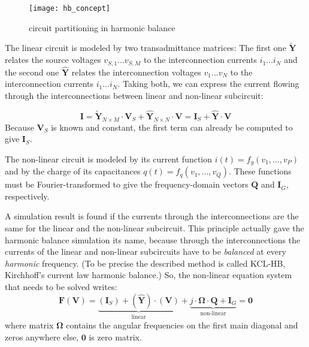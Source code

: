 \begin{figure}[ht]
\begin{center}
\texttt{[image: hb\_concept]}
\end{center}
\caption{circuit partitioning in harmonic balance}
\label{fig:hb_concept}
\end{figure}
\FloatBarrier

The linear circuit is modeled by two transadmittance matrices:
The first one $\tilde{\boldsymbol{Y}}$
relates the source voltages $v_{S,1}...v_{S,M}$ to the interconnection
currents $i_1...i_N$ and the second one $\hat{\boldsymbol{Y}}$
relates the interconnection
voltages $v_1...v_N$ to the interconnection currents $i_1...i_N$.
Taking both, we can express the current flowing through the
interconnections between linear and non-linear subcircuit:

\begin{equation}
\label{eqn:HBlin}
\boldsymbol{I}
  = \boldsymbol{\tilde{Y}}_{N\times M}\cdot \boldsymbol{V}_S +
    \boldsymbol{\hat{Y}}_{N\times N}\cdot \boldsymbol{V}
  = \boldsymbol{I}_S + \boldsymbol{\hat{Y}}\cdot \boldsymbol{V}
\end{equation}
Because $\boldsymbol{V}_S$ is known and constant, the first term
can already be computed to give $\boldsymbol{I}_S$.

\addvspace{12pt}

The non-linear circuit is modeled by its current function
$i(t) = f_g(v_1, ..., v_P)$
and by the charge of its capacitances
$q(t) = f_q(v_1, ..., v_Q)$.
These functions must be Fourier-transformed to give the
frequency-domain vectors $\boldsymbol{Q}$ and $\boldsymbol{I}_G$,
respectively.

\addvspace{12pt}

A simulation result is found if the currents through the
interconnections are the same for the linear and the non-linear
subcircuit. This principle actually gave the harmonic balance
simulation its name, because through the interconnections the
currents of the linear and non-linear subcircuits have to be
\textit{balanced} at every \textit{harmonic} frequency. (To
be precise the described method is called KCL-HB, Kirchhoff's
current law harmonic balance.) So, the non-linear equation
system that needs to be solved writes:
\begin{equation}
\label{eqn:HBeqn}
\textbf{F}(\textbf{V})
  = \underbrace{(\boldsymbol{I}_S) + (\boldsymbol{\hat{Y}})\cdot (\boldsymbol{V})}_{\text{linear}}
  + \underbrace{j\cdot \boldsymbol{\Omega}\cdot \boldsymbol{Q} + \boldsymbol{I}_G}_{\text{non-linear}}
  = \boldsymbol{0}
\end{equation}
where matrix $\boldsymbol{\Omega}$ contains the angular frequencies
on the first main diagonal and zeros anywhere else, $\boldsymbol{0}$
is zero matrix.

